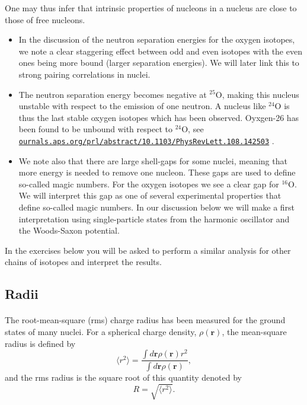 \documentclass[%
twoside,                 %
final,                   %
10pt]{article}
\begin{document}
\noindent
One may thus infer that intrinsic properties of nucleons in a nucleus are close to those of free nucleons.
\begin{itemize}
\item In the discussion of the neutron separation energies for the oxygen isotopes, we note  a clear staggering effect between odd and even isotopes with the even ones being more bound (larger separation energies). We will later link this to strong pairing correlations in nuclei.

\item The neutron separation energy becomes negative at ${}^{25}\mbox{O}$, making this nucleus unstable with respect to the emission of one neutron. A nucleus like ${}^{24}\mbox{O}$ is thus the last stable oxygen isotopes which has been observed. Oyxgen-26 has been found to be unbound with respect to ${}^{24}\mbox{O}$, see \href{{ournals.aps.org/prl/abstract/10.1103/PhysRevLett.108.142503}}{\nolinkurl{ournals.aps.org/prl/abstract/10.1103/PhysRevLett.108.142503}} .

\item We note also that there are large shell-gaps for some nuclei, meaning that more energy is needed to remove one nucleon. These gaps are used to define so-called magic numbers. For the oxygen isotopes we see a clear gap for ${}^{16}\mbox{O}$. We will interpret this gap as one of several experimental properties that define so-called magic numbers. In our discussion below we will make a first interpretation using  single-particle states from the harmonic oscillator and the Woods-Saxon potential. 
\end{itemize}

\noindent
In the exercises below you will be asked to perform a similar analysis for other chains of isotopes and interpret the results.

 


\subsection*{Radii}

\paragraph{}
The root-mean-square (rms) charge radius has been measured for the ground states of many
nuclei. For a spherical charge density, $\rho(\bm{r})$, the mean-square radius is defined by
\[
\langle r^2\rangle = \frac{ \int  d \bm{r} \rho(\bm{r}) r^2}{ \int  d \bm{r} \rho(\bm{r})},
\]
and the rms radius is the square root of this quantity denoted by
\[
R =\sqrt{ \langle r^2\rangle}.
\]
\end{document}
